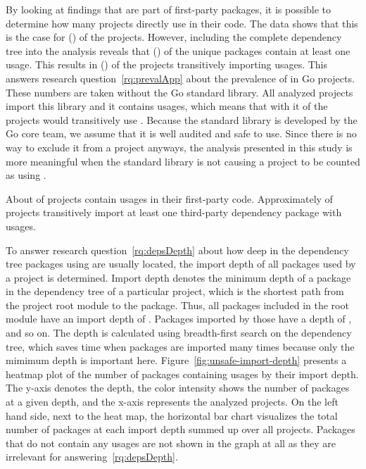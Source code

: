 By looking at \unsafe{} findings that are part of first-party packages, it is possible to determine how many projects
directly use \unsafe{} in their code.
The data shows that this is the case for \unsafeProjects{} (\percentageUnsafeProjects{}) of the \projsAnalyzed{}
projects.
However, including the complete dependency tree into the analysis reveals that \unsafePackages{}
(\percentageUnsafePackages{}) of the \packagesAnalyzed{} unique packages contain at least one \unsafe{} usage.
This results in \unsafeTransitiveWithDependencies{} (\percentageUnsafeTransitiveWithDependencies{}) of the projects
transitively importing \unsafe{} usages.
This answers research question~\ref{rq:prevalApp} about the prevalence of \unsafe{} in Go projects.
These numbers are taken without the Go standard library.
All analyzed projects import this library and it contains \unsafe{} usages, which means that with it
 of the projects would transitively use \unsafe{}.
Because the standard library is developed by the Go core team, we assume that it is well audited and safe to use.
Since there is no way to exclude it from a project anyways, the analysis presented in this study is more meaningful
when the standard library is not causing a project to be counted as using \unsafe{}.

\begin{answerToRQ}[\ref{rq:prevalApp}]
    About \percentageUnsafeProjectsRounded{} of projects contain \unsafe{} usages in their first-party code.
    Approximately \percentageUnsafeTransitiveWithDependenciesRounded{} of projects transitively import at least one
    third-party dependency package with \unsafe{} usages.
\end{answerToRQ}

To answer research question~\ref{rq:depsDepth} about how deep in the dependency tree packages using \unsafe{} are
usually located, the import depth of all packages used by a project is determined.
Import depth denotes the minimum depth of a package in the dependency tree of a particular project, which is the
shortest path from the project root module to the package.
Thus, all packages included in the root module have an import depth of .
Packages imported by those have a depth of , and so on.
The depth is calculated using breadth-first search on the dependency tree, which saves time when packages are imported
many times because only the mimimum depth is important here.
Figure~\ref{fig:unsafe-import-depth} presents a heatmap plot of the number of packages containing \unsafe{} usages by
their import depth.
The y-axis denotes the depth, the color intensity shows the number of \unsafe{} packages at a given depth, and the
x-axis represents the \projsAnalyzed{} analyzed projects.
On the left hand side, next to the heat map, the horizontal bar chart visualizes the total number of packages at each
import depth summed up over all projects.
Packages that do not contain any \unsafe{} usages are not shown in the graph at all as they are irrelevant for
answering~\ref{rq:depsDepth}.

